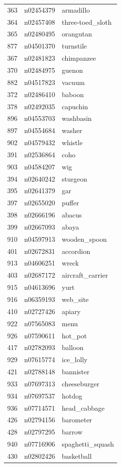 \begin{table}
\begin{tabular}{cll}
363 & n02454379 & armadillo \\
364 & n02457408 & three-toed_sloth \\
365 & n02480495 & orangutan \\
877 & n04501370 & turnstile \\
367 & n02481823 & chimpanzee \\
370 & n02484975 & guenon \\
882 & n04517823 & vacuum \\
372 & n02486410 & baboon \\
378 & n02492035 & capuchin \\
896 & n04553703 & washbasin \\
897 & n04554684 & washer \\
902 & n04579432 & whistle \\
391 & n02536864 & coho \\
903 & n04584207 & wig \\
394 & n02640242 & sturgeon \\
395 & n02641379 & gar \\
397 & n02655020 & puffer \\
398 & n02666196 & abacus \\
399 & n02667093 & abaya \\
910 & n04597913 & wooden_spoon \\
401 & n02672831 & accordion \\
913 & n04606251 & wreck \\
403 & n02687172 & aircraft_carrier \\
915 & n04613696 & yurt \\
916 & n06359193 & web_site \\
410 & n02727426 & apiary \\
922 & n07565083 & menu \\
926 & n07590611 & hot_pot \\
417 & n02782093 & balloon \\
929 & n07615774 & ice_lolly \\
421 & n02788148 & bannister \\
933 & n07697313 & cheeseburger \\
934 & n07697537 & hotdog \\
936 & n07714571 & head_cabbage \\
426 & n02794156 & barometer \\
428 & n02797295 & barrow \\
940 & n07716906 & spaghetti_squash \\
430 & n02802426 & basketball \\

\end{tabular}
\end{table}
